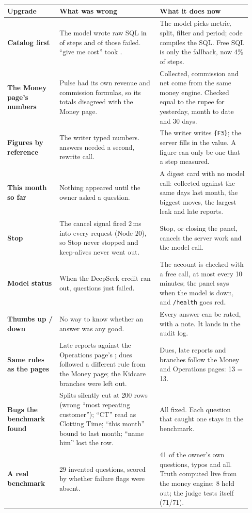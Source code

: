 \documentclass[10pt,a4paper]{article}
\newcommand{\code}[1]{\texttt{\small #1}}
\newcommand{\was}[1]{\leavevmode{\color{brick}#1}}
\begin{document}
{\footnotesize
\begin{tabular}{@{}L{2.5cm}L{6.6cm}L{8.2cm}@{}}
\toprule
\textbf{Upgrade} & \textbf{What was wrong} & \textbf{What it does now}\\
\midrule
\textbf{Catalog first} & The model wrote raw SQL in \was{50\%} of steps and \was{29\%} of those failed. ``give me cost'' took
 \was{31 calls}. & The model picks metric, split, filter and period; code compiles the SQL. Free SQL is only the fallback, now 4\% of steps.\\
\textbf{The Money page's numbers} & Pulse had its own revenue and commission formulas, so its totals disagreed with the Money page. &
 Collected, commission and net come from the same money engine. Checked equal to the rupee for yesterday, month to date and 30 days.\\
\textbf{Figures by reference} & The writer typed numbers. \was{15 of 31} answers needed a second, rewrite call. &
 The writer writes \code{\{F3\}}; the server fills in the value. A figure can only be one that a step measured.\\
\textbf{This month so far} & Nothing appeared until the owner asked a question. & A digest card with no model call:
 collected against the same days last month, the biggest moves, the largest leak and late reports.\\
\textbf{Stop} & The cancel signal fired 2\,ms into every request (Node 20), so Stop never stopped and keep-alives never went out. &
 Stop, or closing the panel, cancels the server work and the model call.\\
\textbf{Model status} & When the DeepSeek credit ran out, questions just failed. & The account is checked with a free call, at most every 10 minutes;
 the panel says when the model is down, and \code{/health} goes red.\\
\textbf{Thumbs up / down} & No way to know whether an answer was any good. & Every answer can be rated, with a note. It lands in the audit log.\\
\textbf{Same rules as the pages} & Late reports \was{349} against the Operations page's \was{13}; dues followed a different rule from the Money page; the Kidcare branches were left out. &
 Dues, late reports and branches follow the Money and Operations pages: 13 = 13.\\
\textbf{Bugs the benchmark found} & Splits silently cut at 200 rows (wrong ``most repeating customer''); ``CT'' read as Clotting Time;
 ``this month'' bound to last month; ``name him'' lost the row. & All fixed. Each question that caught one stays in the benchmark.\\
\textbf{A real benchmark} & 29 invented questions, scored by whether failure flags were absent. &
 41 of the owner's own questions, typos and all. Truth computed live from the money engine; 8 held out; the judge tests itself (71/71).\\
\bottomrule
\end{tabular}}
\end{document}
